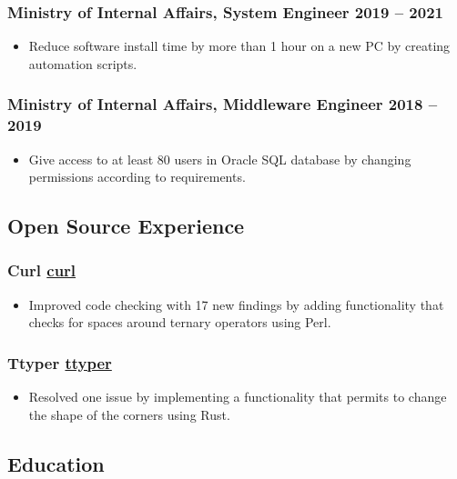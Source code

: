 \documentclass[a4paper,12pt]{article}
\begin{document}
\subsubsection*{\textbf{Ministry of Internal Affairs}, System Engineer \hfill 2019 -- 2021}
\label{sec:org3f5513b}
\begin{itemize}
\item Reduce software install time by more than 1 hour on a new PC by creating automation scripts.
\end{itemize}
\subsubsection*{\textbf{Ministry of Internal Affairs}, Middleware Engineer \hfill 2018 -- 2019}
\label{sec:org236474d}
\begin{itemize}
\item Give access to at least 80 users in Oracle SQL database by changing permissions according
to requirements.
\end{itemize}
\subsection*{\textbf{Open Source Experience}}
\label{sec:orge86496c}
\subsubsection*{\textbf{Curl} \hfill \href{https://github.com/curl/curl}{curl}}
\label{sec:orgf4b24d9}
\begin{itemize}
\item Improved code checking with 17 new findings by adding functionality
that checks for spaces around ternary operators using Perl.
\end{itemize}
\subsubsection*{\textbf{Ttyper} \hfill \href{https://github.com/maxniederman/ttyper}{ttyper}}
\label{sec:orga05a1cb}
\begin{itemize}
\item Resolved one issue by implementing a functionality that permits to change the shape of the corners using Rust.
\end{itemize}
\subsection*{\textbf{Education}}
\label{sec:orgc125ed4}
\end{document}
